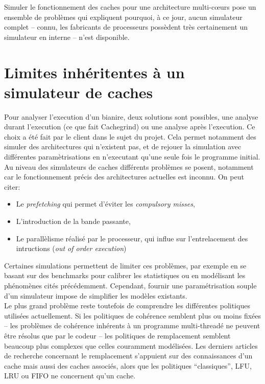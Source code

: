 Simuler le fonctionnement des caches pour une architecture multi-c{\oe}urs pose un ensemble de problèmes qui expliquent pourquoi, à ce jour, aucun simulateur complet -- connu, les fabricants de processeurs possèdent très certainement un simulateur en interne -- n'est disponible. 

\section{Limites inhéritentes à un simulateur de caches}
Pour analyser l'execution d'un bianire, deux solutions sont possibles, une analyse durant l'execution (ce que fait \textsf{Cachegrind}) ou une analyse après l'execution. Ce choix a été fait par le client dans le sujet du projet. Cela permet notamment des simuler des architectures qui n'existent pas, et de rejouer la simulation avec différentes paramètrisations en n'executant qu'une seule fois le programme initial. \\

Au niveau des simulateurs de caches différents problèmes se posent, notamment car le fonctionnement précis des architectures actuelles est inconnu. On peut citer: \\
\begin{itemize}
\item Le \emph{prefetching} qui permet d'éviter les \emph{compulsory misses}, 
\item L'introduction de la bande passante, 
\item Le parallèlisme réalisé par le processeur, qui influe sur l'entrelacement des intructions (\emph{out of order execution}) \\
\end{itemize}

Certaines simulations permettent de limiter ces problèmes, par exemple en se basant sur des benchmarks pour calibrer les statistiques ou en modélisant les phénomènes cités précédemment. Cependant, fournir une paramétrisation souple d'un simulateur impose de simplifier les modèles existants. \\

Le plus grand problème reste toutefois de comprendre les différentes politiques utilisées actuellement. Si les politiques de cohérence semblent plus ou moins fixées -- les problèmes de cohérence inhérents à un programme multi-threadé ne peuvent être résolus que par le codeur -- les politiques de remplacement semblent beaucoup plus complexes que celles couramment modélisées. Les derniers articles de recherche concernant le remplacement s'appuient sur des connaissances d'un cache mais aussi des caches associés, alors que les politiques ``classiques'', LFU, LRU ou FIFO ne concernent qu'un cache.

